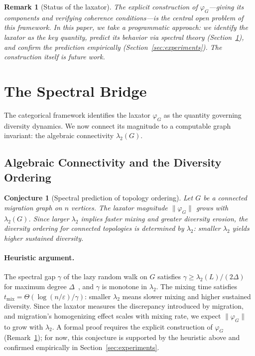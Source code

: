 \documentclass[submission,copyright,creativecommons]{eptcs}
\newtheorem{conjecture}{Conjecture}
\newtheorem{remark}{Remark}
\begin{document}
\begin{remark}[Status of the laxator]
\label{rem:laxator-status}
The explicit construction of $\varphi_G$---giving its components and
verifying coherence conditions---is the central open problem of this
framework. In this paper, we take a programmatic approach: we identify
the laxator as the key quantity, predict its behavior via spectral
theory (Section~\ref{sec:spectral}), and confirm the prediction
empirically (Section~\ref{sec:experiments}). The construction itself
is future work.
\end{remark}

\section{The Spectral Bridge}
\label{sec:spectral}

The categorical framework identifies the laxator $\varphi_G$ as the
quantity governing diversity dynamics. We now connect its magnitude
to a computable graph invariant: the algebraic connectivity
$\lambda_2(G)$.

\subsection{Algebraic Connectivity and the Diversity Ordering}

\begin{conjecture}[Spectral prediction of topology ordering]
\label{prop:spectral}
Let $G$ be a connected migration graph on $n$ vertices.
The laxator magnitude $\|\varphi_G\|$ grows with
$\lambda_2(G)$. Since larger $\lambda_2$ implies faster mixing
and greater diversity erosion, the diversity ordering for
connected topologies is determined by $\lambda_2$: smaller
$\lambda_2$ yields higher sustained diversity.
\end{conjecture}

\paragraph{Heuristic argument.}
The spectral gap $\gamma$ of the lazy random walk on $G$ satisfies
$\gamma \geq \lambda_2(L)/(2\Delta)$ for maximum degree
$\Delta$~\cite{levin2009markov}, and $\gamma$ is monotone in
$\lambda_2$. The mixing time satisfies
$t_{\mathrm{mix}} = \Theta(\log(n/\varepsilon)/\gamma)$: smaller
$\lambda_2$ means slower mixing and higher sustained diversity.
Since the laxator measures the discrepancy introduced by
migration, and migration's homogenizing effect scales with
mixing rate, we expect $\|\varphi_G\|$ to grow with $\lambda_2$.
A formal proof requires the explicit construction of $\varphi_G$
(Remark~\ref{rem:laxator-status}); for now, this conjecture is
supported by the heuristic above and confirmed empirically in
Section~\ref{sec:experiments}.
\end{document}
